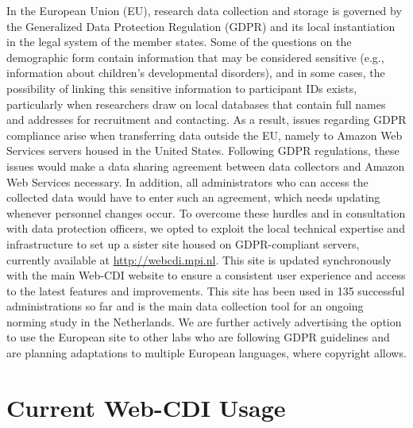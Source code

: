 \documentclass[
  english,
  ,man,floatsintext]{apa6}
\begin{document}
In the European Union (EU), research data collection and storage is governed by the Generalized Data Protection Regulation (GDPR) and its local instantiation in the legal system of the member states. Some of the questions on the demographic form contain information that may be considered sensitive (e.g., information about children's developmental disorders), and in some cases, the possibility of linking this sensitive information to participant IDs exists, particularly when researchers draw on local databases that contain full names and addresses for recruitment and contacting. As a result, issues regarding GDPR compliance arise when transferring data outside the EU, namely to Amazon Web Services servers housed in the United States. Following GDPR regulations, these issues would make a data sharing agreement between data collectors and Amazon Web Services necessary. In addition, all administrators who can access the collected data would have to enter such an agreement, which needs updating whenever personnel changes occur. To overcome these hurdles and in consultation with data protection officers, we opted to exploit the local technical expertise and infrastructure to set up a sister site housed on GDPR-compliant servers, currently available at \url{http://webcdi.mpi.nl}. This site is updated synchronously with the main Web-CDI website to ensure a consistent user experience and access to the latest features and improvements. This site has been used in 135 successful administrations so far and is the main data collection tool for an ongoing norming study in the Netherlands. We are further actively advertising the option to use the European site to other labs who are following GDPR guidelines and are planning adaptations to multiple European languages, where copyright allows.

\hypertarget{current-web-cdi-usage}{%
\section{Current Web-CDI Usage}\label{current-web-cdi-usage}}
\end{document}

